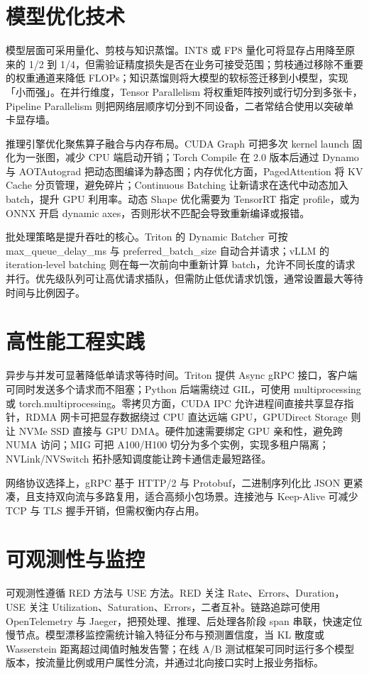 \chapter{模型优化技术}
模型层面可采用量化、剪枝与知识蒸馏。INT8 或 FP8 量化可将显存占用降至原来的 1/2 到 1/4，但需验证精度损失是否在业务可接受范围；剪枝通过移除不重要的权重通道来降低 FLOPs；知识蒸馏则将大模型的软标签迁移到小模型，实现「小而强」。在并行维度，Tensor Parallelism 将权重矩阵按列或行切分到多张卡，Pipeline Parallelism 则把网络层顺序切分到不同设备，二者常结合使用以突破单卡显存墙。\par
推理引擎优化聚焦算子融合与内存布局。CUDA Graph 可把多次 kernel launch 固化为一张图，减少 CPU 端启动开销；Torch Compile 在 2.0 版本后通过 Dynamo 与 AOTAutograd 把动态图编译为静态图；内存优化方面，PagedAttention 将 KV Cache 分页管理，避免碎片；Continuous Batching 让新请求在迭代中动态加入 batch，提升 GPU 利用率。动态 Shape 优化需要为 TensorRT 指定 profile，或为 ONNX 开启 dynamic axes，否则形状不匹配会导致重新编译或报错。\par
批处理策略是提升吞吐的核心。Triton 的 Dynamic Batcher 可按 max\_{}queue\_{}delay\_{}ms 与 preferred\_{}batch\_{}size 自动合并请求；vLLM 的 iteration-level batching 则在每一次前向中重新计算 batch，允许不同长度的请求并行。优先级队列可让高优请求插队，但需防止低优请求饥饿，通常设置最大等待时间与比例因子。\par
\chapter{高性能工程实践}
异步与并发可显著降低单请求等待时间。Triton 提供 Async gRPC 接口，客户端可同时发送多个请求而不阻塞；Python 后端需绕过 GIL，可使用 multiprocessing 或 torch.multiprocessing。零拷贝方面，CUDA IPC 允许进程间直接共享显存指针，RDMA 网卡可把显存数据绕过 CPU 直达远端 GPU，GPUDirect Storage 则让 NVMe SSD 直接与 GPU DMA。硬件加速需要绑定 GPU 亲和性，避免跨 NUMA 访问；MIG 可把 A100/H100 切分为多个实例，实现多租户隔离；NVLink/NVSwitch 拓扑感知调度能让跨卡通信走最短路径。\par
网络协议选择上，gRPC 基于 HTTP/2 与 Protobuf，二进制序列化比 JSON 更紧凑，且支持双向流与多路复用，适合高频小包场景。连接池与 Keep-Alive 可减少 TCP 与 TLS 握手开销，但需权衡内存占用。\par
\chapter{可观测性与监控}
可观测性遵循 RED 方法与 USE 方法。RED 关注 Rate、Errors、Duration，USE 关注 Utilization、Saturation、Errors，二者互补。链路追踪可使用 OpenTelemetry 与 Jaeger，把预处理、推理、后处理各阶段 span 串联，快速定位慢节点。模型漂移监控需统计输入特征分布与预测置信度，当 KL 散度或 Wasserstein 距离超过阈值时触发告警；在线 A/B 测试框架可同时运行多个模型版本，按流量比例或用户属性分流，并通过北向接口实时上报业务指标。\par
